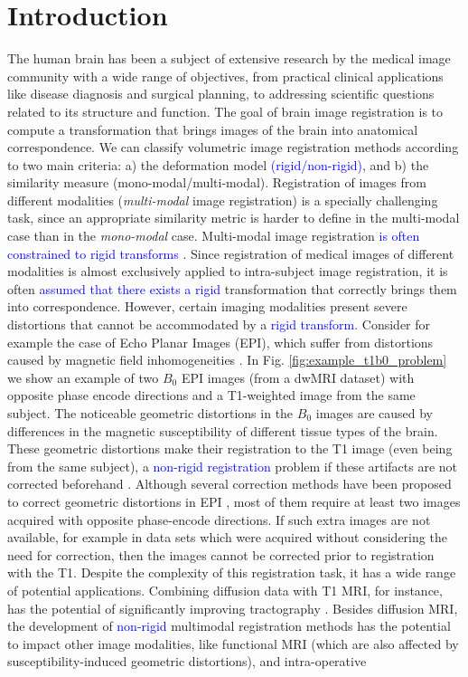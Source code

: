 \vspace{-0.5cm}
\section{Introduction}
The human brain has been a subject of extensive research by the medical image community with a wide range of objectives, from practical clinical applications like disease diagnosis and surgical planning, to addressing scientific questions related to its structure and function. The goal of brain image registration is to compute a transformation that brings images of the brain into anatomical correspondence. We can classify volumetric image registration methods according to two main criteria: a) the deformation model \textcolor{blue}{(rigid/non-rigid)}, and b) the similarity measure (mono-modal/multi-modal). Registration of images from different modalities (\emph{multi-modal} image registration) is a specially challenging task, since an appropriate similarity metric is harder to define in the multi-modal case than in the \emph{mono-modal} case. Multi-modal image registration \textcolor{blue}{is often constrained to rigid transforms \cite{DeNigris2012, Orchard2008, Orchard2010, Maes1997, Roche1998}}. Since registration of medical images of different modalities is almost exclusively applied to intra-subject image registration, it is often \textcolor{blue}{assumed that there exists a rigid} transformation that correctly brings them into correspondence. However, certain imaging modalities present severe distortions that cannot be accommodated by a \textcolor{blue}{rigid transform}. Consider for example the case of Echo Planar Images (EPI), which suffer from distortions caused by magnetic field inhomogeneities \cite{Tournier2011, Andersson2003}. In Fig. \ref{fig:example_t1b0_problem} we show an example of two $B_{0}$ EPI images (from a dwMRI dataset) with opposite phase encode directions and a T1-weighted image from the same subject. The noticeable geometric distortions in the $B_{0}$ images are caused by differences in the magnetic susceptibility of different tissue types of the brain. These geometric distortions make their registration to the T1 image (even being from the same subject), a \textcolor{blue}{non-rigid registration} problem if these artifacts are not corrected beforehand \cite{Bhushan2015}. Although several correction methods have been proposed to correct geometric distortions in EPI \cite{Andersson2003, Holland2010, Ruthotto, Irfanoglu2015}, most of them require at least two images acquired with opposite phase-encode directions. If such extra images are not available, for example in data sets which were acquired without considering the need for correction, then the images cannot be corrected prior to registration with the T1. Despite the complexity of this registration task, it has a wide range of potential applications. Combining diffusion data with T1 MRI, for instance, has the potential of significantly improving tractography \cite{Smith2012, Girard2014}. Besides diffusion MRI, the development of \textcolor{blue}{non-rigid} multimodal registration methods has the potential to impact other image modalities, like functional MRI (which are also affected by susceptibility-induced geometric distortions), and intra-operative 